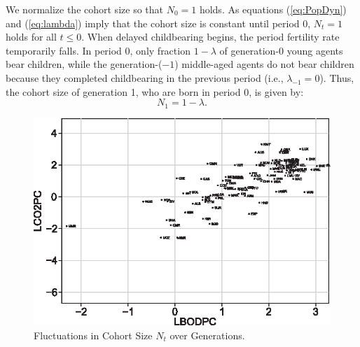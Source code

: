 \documentclass[nogrid]{MBE}%
\begin{document}
{We normalize the cohort size so that $N_{0}=1$ holds. As equations
(\ref{eq:PopDyn}) and (\ref{eq:lambda}) imply that the cohort size is constant
until period 0, $N_{t}=1$ holds for all $t\leq0$. When delayed childbearing
begins, the period fertility rate temporarily falls. In period 0, only
fraction $1-\lambda$ of generation-0 young agents bear children, while the
generation-($-1$) middle-aged agents do not bear children because they
completed childbearing in the previous period (i.e., $\lambda_{-1}=0$). Thus,
the cohort size of generation 1, who are born in period 0, is given by:
\begin{equation}
N_{1}=1-\lambda. \label{eq:N1}%
\end{equation}


\begin{figure}[t]
\begin{center}
\includegraphics[height=0.21\textheight]{flrf1.eps}
\end{center}
\caption{Fluctuations in Cohort Size $N_{t}$ over Generations.}%
\label{fig:popdynamics}%
\end{figure}


}
\end{document}
